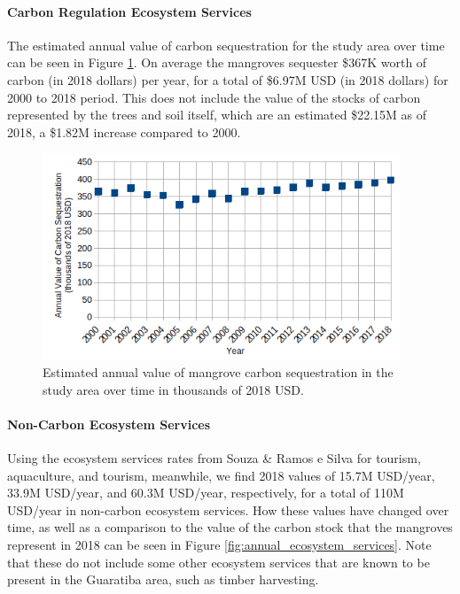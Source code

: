 \paragraph{Carbon Regulation Ecosystem Services} \leavevmode\newline

The estimated annual value of carbon sequestration for the study area over time can be seen in Figure \ref{fig:carbon_sequestration_value}. On average the mangroves sequester \$367K worth of carbon (in 2018 dollars) per year, for a total of \$6.97M USD (in 2018 dollars) for 2000 to 2018 period. This does not include the value of the stocks of carbon represented by the trees and soil itself, which are an estimated \$22.15M as of 2018, a \$1.82M increase compared to 2000.
    
\begin{figure}[!htb] 
\centering
\includegraphics[width=0.95\textwidth]{Figures/chap4/carbon_sequestration_value.png}
\caption[Annual Value of Mangrove Carbon Sequestration]{Estimated annual value of mangrove carbon sequestration in the study area over time in thousands of 2018 USD.}
\label{fig:carbon_sequestration_value}
\end{figure}

\paragraph{Non-Carbon Ecosystem Services} \leavevmode\newline


Using the ecosystem services rates from Souza \& Ramos e Silva \cite{souzaEcologicalEconomicValuation2011} for tourism, aquaculture, and tourism, meanwhile, we find 2018 values of 15.7M USD/year, 33.9M USD/year, and 60.3M USD/year, respectively, for a total of 110M USD/year in non-carbon ecosystem services. How these values have changed over time, as well as a comparison to the value of the carbon stock that the mangroves represent in 2018 can be seen in Figure \ref{fig:annual_ecosystem_services}. Note that these do not include some other ecosystem services that are known to be present in the Guaratiba area, such as timber harvesting.

